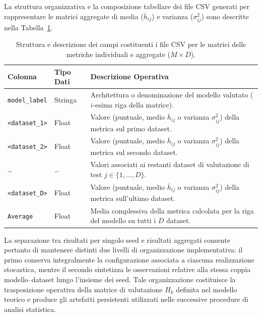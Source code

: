La struttura organizzativa e la composizione tabellare dei file CSV generati per rappresentare le matrici aggregate di media ($\overline{h}_{ij}$) e varianza ($\sigma^2_{ij}$) sono descritte nella Tabella~\ref{tab:aggregated_metrics_csv_structure}.

\begin{table}[H]
    \centering
    \small
    \caption{Struttura e descrizione dei campi costituenti i file CSV per le matrici delle metriche individuali e aggregate ($M \times D$).}
    \label{tab:aggregated_metrics_csv_structure}
    \begin{tabularx}{\textwidth}{l l >{\raggedright\arraybackslash}X}
        \toprule
        \textbf{Colonna} & \textbf{Tipo Dati} & \textbf{Descrizione Operativa} \\
        \midrule
        \texttt{model\_label} & Stringa & Architettura o denominazione del modello valutato ($i$-esima riga della matrice). \\
        \addlinespace
        \texttt{<dataset\_1>} & Float & Valore (puntuale, medio $\overline{h}_{ij}$ o varianza $\sigma^2_{ij}$) della metrica sul primo dataset. \\
        \addlinespace
        \texttt{<dataset\_2>} & Float & Valore (puntuale, medio $\overline{h}_{ij}$ o varianza $\sigma^2_{ij}$) della metrica sul secondo dataset. \\
        \addlinespace
        \dots & \dots & Valori associati ai restanti dataset di valutazione di test $j \in \{1, \dots, D\}$. \\
        \addlinespace
        \texttt{<dataset\_D>} & Float & Valore (puntuale, medio $\overline{h}_{ij}$ o varianza $\sigma^2_{ij}$) della metrica sull'ultimo dataset. \\
        \addlinespace
        \texttt{Average} & Float & Media complessiva della metrica calcolata per la riga del modello su tutti i $D$ dataset. \\
        \bottomrule
    \end{tabularx}
\end{table}

La separazione tra risultati per singolo seed e risultati aggregati consente pertanto di mantenere distinti due livelli di organizzazione implementativa: il primo conserva integralmente la configurazione associata a ciascuna realizzazione stocastica, mentre il secondo sintetizza le osservazioni relative alla stessa coppia modello--dataset lungo l'insieme dei seed. 
Tale organizzazione costituisce la trasposizione operativa della matrice di valutazione $H_k$ definita nel modello teorico e produce gli artefatti persistenti utilizzati nelle successive procedure di analisi statistica.
    
